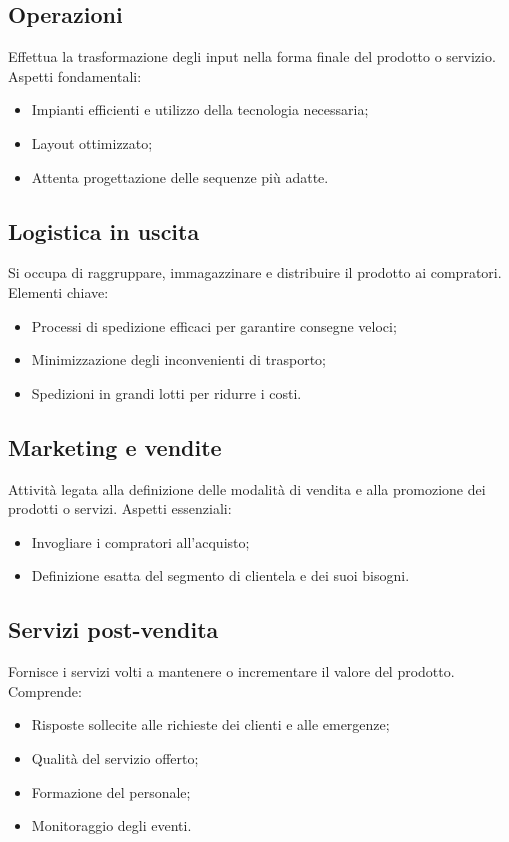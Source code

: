 \documentclass[a4paper,12pt]{article}
\begin{document}
\subsection{Operazioni}
Effettua la trasformazione degli input nella forma finale del prodotto o servizio.  
Aspetti fondamentali:
\begin{itemize}
    \item Impianti efficienti e utilizzo della tecnologia necessaria;
    \item Layout ottimizzato;
    \item Attenta progettazione delle sequenze più adatte.
\end{itemize}

\subsection{Logistica in uscita}
Si occupa di raggruppare, immagazzinare e distribuire il prodotto ai compratori.  
Elementi chiave:
\begin{itemize}
    \item Processi di spedizione efficaci per garantire consegne veloci;
    \item Minimizzazione degli inconvenienti di trasporto;
    \item Spedizioni in grandi lotti per ridurre i costi.
\end{itemize}

\subsection{Marketing e vendite}
Attività legata alla definizione delle modalità di vendita e alla promozione dei prodotti o servizi.  
Aspetti essenziali:
\begin{itemize}
    \item Invogliare i compratori all’acquisto;
    \item Definizione esatta del segmento di clientela e dei suoi bisogni.
\end{itemize}

\subsection{Servizi post-vendita}
Fornisce i servizi volti a mantenere o incrementare il valore del prodotto.  
Comprende:
\begin{itemize}
    \item Risposte sollecite alle richieste dei clienti e alle emergenze;
    \item Qualità del servizio offerto;
    \item Formazione del personale;
    \item Monitoraggio degli eventi.
\end{itemize}
\end{document}
